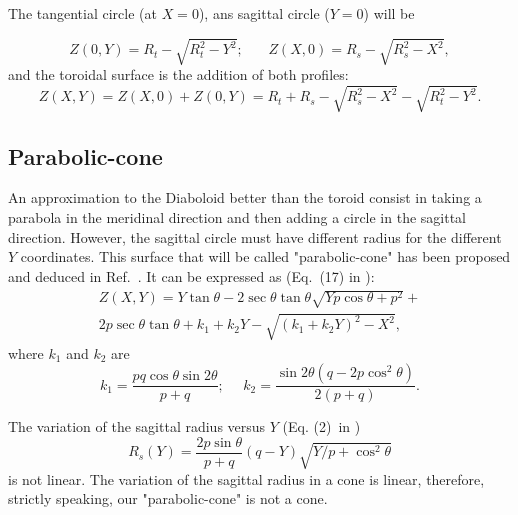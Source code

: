 \documentclass{iucr}              %
\begin{document}
The tangential circle (at $X=0$), ans sagittal circle ($Y=0$) will be

\begin{equation}
\label{eqn:toroidTS}
Z(0,Y) = R_t - \sqrt{R_t^2 - Y^2};~~~~~~~~
Z(X,0) = R_s - \sqrt{R_s^2 - X^2},
\end{equation}
and the toroidal surface is the addition of both profiles: 
\begin{equation}
\label{eqn:toroid}
Z(X,Y) = Z(X,0) + Z(0,Y) = 
R_t + R_s - \sqrt{R_s^2 - X^2}
- \sqrt{R_t^2 - Y^2}.
\end{equation}

\subsection{Parabolic-cone}
An approximation to the Diaboloid better than the toroid consist in taking a parabola in the meridinal direction and then adding a circle in the sagittal direction. However, the sagittal circle must have different radius for the different $Y$ coordinates. This surface that will be called "parabolic-cone" has been proposed and deduced in Ref.~\cite{Valeriy2020c}. It can be expressed as (Eq.~(17) in \cite{Valeriy2020c}):
\begin{multline}
\label{eqn:parabolicCone}
Z(X,Y) = Y \tan\theta - 2 \sec\theta \tan\theta
\sqrt{Y p \cos\theta + p^2} + \\
2 p \sec\theta \tan\theta +
k_1 + k_2 Y - \sqrt{(k_1 + k_2 Y)^2 - X^2},
\end{multline}
where $k_1$ and $k_2$ are
\begin{equation}
k_1 = \frac{p q \cos\theta \sin2\theta}{p+q};~~~~~~
k_2 = \frac{\sin2\theta(q-2p\cos^2\theta)}{2(p+q)}.
\end{equation}

The variation of the sagittal radius versus $Y$  (Eq. (2)\ in \cite{Valeriy2020c})
\begin{equation}
\label{eq:sagRadius}
R_s(Y) = \frac{2  p \sin\theta}{p + q} (q - Y)   \sqrt{Y / p + \cos^2\theta}
\end{equation}
is not linear. The variation of the sagittal radius in a cone is linear, therefore, strictly speaking, our "parabolic-cone" is not a cone. 
\end{document}
